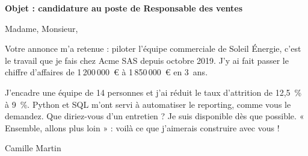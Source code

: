 \renewcommand{\today}{Lyon, le 29 octobre 2026}
\renewcommand{\signoff}{Je vous prie d'agréer, Madame, Monsieur, l'expression de mes salutations distinguées.}



\noindent\textbf{Objet : candidature au poste de Responsable des ventes}

\noindent Madame, Monsieur,

\noindent Votre annonce m'a retenue : piloter l'équipe commerciale de Soleil Énergie, c'est le travail que je fais chez Acme SAS depuis octobre 2019. J'y ai fait passer le chiffre d'affaires de 1\,200\,000~€ à 1\,850\,000~€ en 3~ans.

\noindent J'encadre une équipe de 14 personnes et j'ai réduit le taux d'attrition de 12,5~\% à 9~\%. Python et SQL m'ont servi à automatiser le reporting, comme vous le demandez. Que diriez-vous d'un entretien ? Je suis disponible dès que possible. « Ensemble, allons plus loin » : voilà ce que j'aimerais construire avec vous !

\closing{Camille Martin}
